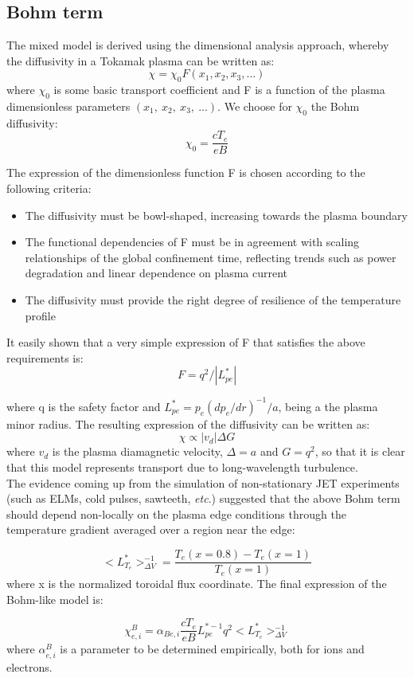 \subsection{Bohm term}

The mixed model is derived using the dimensional analysis approach,
whereby the diffusivity in a Tokamak plasma can be written as:\hfill
\[ \chi = \chi_0 F(x_1, x_2, x_3, ...)\]
where $\chi_0$ is some basic transport coefficient and F is a function
of the plasma dimensionless parameters $(x_1,\ x_2,\ x_3,\ ...)$. We choose
for $\chi_0$ the Bohm diffusivity:\hfill
\[ \chi_0 = \frac{cT_e}{eB}\]

The expression of the dimensionless function F is chosen according to
the following criteria:\
\begin{itemize}
\item{The diffusivity must be bowl-shaped, increasing towards the plasma
boundary}
\item{The functional dependencies of F must be in agreement with
scaling relationships of the global confinement time, reflecting
trends such as power degradation and linear dependence on plasma
current}
\item{The diffusivity must provide the right degree of resilience
of the temperature profile}
\end{itemize}

It easily shown that a very simple expression of F that satisfies
the above requirements is:\hfill
\[ F = q^2/|L_{pe}^*|\]

where q is the safety factor and $L_{pe}^*=p_e(dp_e/dr)^{-1}/a$, being a the
plasma minor radius. The resulting expression of the diffusivity
can be written as:\hfill
\[ \chi \propto |v_d| \Delta G\]
where $v_d$ is the plasma diamagnetic velocity, $\Delta=a$ and $G=q^2$,
so that it is clear that this model represents transport due to
long-wavelength turbulence.\\
The evidence coming up from the simulation of non-stationary
JET experiments \cite{erb97}(such as ELMs, cold pulses, sawteeth, {\sl etc}.)
suggested that the above Bohm term should depend non-locally
on the plasma edge conditions through the temperature
gradient averaged over a region near the edge:\hfill

\[ <L_{T_e}^*>_{\Delta V}^{-1} = \frac{T_e(x=0.8) - T_e(x=1)}{T_e(x=1)}\]
where x is the normalized toroidal flux coordinate. The final
expression of the Bohm-like model is:\hfill

\[ \chi_{e,i}^B = \alpha_{Be,i} \frac{cT_e}{eB} L_{pe}^{*-1} q^2 <L_{T_e}^*>_{\Delta V}^{-1}\]
where $\alpha_{e,i}^B$ is a parameter to be determined empirically,
both for ions and electrons.\hfill

